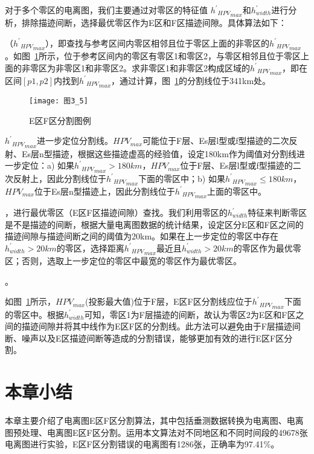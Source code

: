 对于多个零区的电离图，我们主要通过对零区的特征值 ${{h^{'}}_{HPV}}_{max}$和$h_{width}^{'}$进行分析，排除描迹间断，选择最优零区作为E区和F区描迹间隙。具体算法如下：
\begin{enumerate}	 
（${{h^{'}}_{HPV}}_{max}$），即查找与参考区间内零区相邻且位于零区上面的非零区的${{h^{'}}_{HPV}}_{max}$。如图~\ref{图3_5}所示，位于参考区间内的零区有零区1和零区2，与零区相邻且位于零区上面的非零区为非零区1和非零区2。求非零区1和非零区2构成区域的${{h^{'}}_{HPV}}_{max}$，即在区间$[p1,p2]$内找到${{h^{'}}_{HPV}}_{max}$，通过计算，图~\ref{图3_5}的分割线位于341km处。

\begin{figure}[h]
\centering
\texttt{[image: 图3\_5]}
\caption{E区F区分割图例}
\label{图3_5}    
\end{figure}

${{h^{'}}_{HPV}}_{max}$进一步定位分割线。$HPV_{max}$可能位于F层、Es层l型或f型描迹的二次反射、Es层n型描迹，根据这些描迹虚高的经验值，设定180km作为阈值对分割线进一步定位：a) 如果${{h^{'}}_{HPV}}_{max}>180km$，$HPV_{max}$位于F层、Es层l型或f型描迹的二次反射上，因此分割线位于${{h^{'}}_{HPV}}_{max}$下面的零区中；b) 如果${{h^{'}}_{HPV}}_{max} \leq180km$，$HPV_{max}$位于Es层n型描迹上，因此分割线位于${{h^{'}}_{HPV}}_{max}$上面的零区中。
		
，进行最优零区（E区F区描迹间隙）查找。我们利用零区的$h_{width}^{'}$特征来判断零区是不是描迹的间断，根据大量电离图数据的统计结果，设定区分E区和F区之间的描迹间隙与描迹间断之间的阈值为20km。如果在上一步定位的零区中存在$h_{width}^{'}>20km$的零区，选择距离${{h^{'}}_{HPV}}_{max}$最近且$h_{width}^{'}>20km$的零区作为最优零区；否则，选取上一步定位的零区中最宽的零区作为最优零区。	

。
	
\end{enumerate}  

如图~\ref{图3_5}所示，$HPV_{max}$(投影最大值)位于F层，E区F区分割线应位于${{h^{'}}_{HPV}}_{max}$下面的零区中。根据$h_{width}^{'}$可知，零区1为F层描迹的间断，故认为零区2为E区和F区之间的描迹间隙并将其中线作为E区F区的分割线。此方法可以避免由于F层描迹间断、噪声以及E区描迹间断等造成的分割错误，能够更加有效的进行E区F区分割。


\section{本章小结}
\label{3_4}

本章主要介绍了电离图E区F区分割算法，其中包括垂测数据转换为电离图、电离图预处理、电离图E区F区分割。运用本文算法对不同地区和不同时间段的49678张电离图进行实验，E区F区分割错误的电离图有1286张，正确率为97.41\%。


